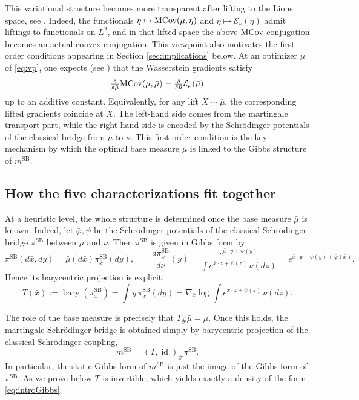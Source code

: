 \documentclass[reqno, a4paper]{amsart}
\DeclareMathOperator{\id}{id}
\newcommand{\msb}{m^{\text{SB}}}
\newcommand{\psb}{\pi^{\text{SB}}}
\theoremstyle{plain}
\theoremstyle{definition}
\theoremstyle{remark}
\numberwithin{equation}{section}
\numberwithin{theorem}{section}
\newcommand{\bary}{\operatorname{bary}}
\newcommand{\MCov}{\textnormal{MCov}}
\begin{document}
	This variational structure becomes more transparent after lifting to the Lions space, see \cite{BaPaSc24, PiSa25, BePaSc25}.
	Indeed,  the functionals \(\eta\mapsto \MCov(\mu,\eta)\) and \(\eta\mapsto \mathcal E_\nu(\eta)\) admit liftings to functionals on \(L^2\), and in that lifted space the above \(\MCov\)-conjugation becomes an actual convex conjugation.
	This viewpoint also motivates the first-order conditions appearing in Section \ref{sec:implications} below.
	At an optimizer \(\bar\mu\) of \eqref{eq:vp}, one expects (see \cite[Section 2]{BePaSc25}) that the Wasserstein gradients satisfy
	\[ \textstyle 
	\frac{\delta}{\delta\bar\mu}\MCov(\mu,\bar\mu)
	=
	\frac{\delta}{\delta\bar\mu}\mathcal E_\nu(\bar\mu)
	\]
	up to an additive constant.
	Equivalently, for any lift \(\bar X\sim\bar\mu\), the corresponding lifted gradients coincide at \(\bar X\).
	The left-hand side comes from the martingale transport part, while the right-hand side is encoded by the Schr\"odinger potentials of the classical bridge from \(\bar\mu\) to \(\nu\).
	This first-order condition is the key mechanism by which the optimal base measure \(\bar\mu\) is linked to the Gibbs structure of \(\msb\).
	
	\subsection{How the five characterizations fit together}
	
	At a heuristic level, the whole structure is determined once the base measure \(\bar\mu\) is known.
	Indeed, let \(\bar \varphi,\psi\) be the Schr\"odinger potentials of the classical Schr\"odinger bridge \(\psb\) between \(\bar\mu\) and \(\nu\).
	Then \(\psb\) is given in Gibbs form by
	\[
	\psb(d \bar x,dy)=\bar\mu(d \bar x)\psb_{\bar x}(dy),
	\qquad
	\frac{d\psb_{\bar x}}{d\nu}(y)=\frac{e^{\bar x\cdot y+\psi (y)}}{\int e^{ \bar x\cdot z+\psi(z)}\,\nu(dz)}=e^{\bar x\cdot y+ \psi (y)+\bar \varphi (\bar x)}.
	\]
	Hence its barycentric projection is explicit:
	\[
	T(\bar x):=\bary(\psb_{\bar x})=\int y\,\psb_{\bar x}(dy)
	=\nabla_{\bar x}\log\int e^{ \bar x \cdot z+\psi(z)}\,\nu(dz).
	\]
	
	The role of the base measure is precisely that \(T_{\#}\bar\mu=\mu\).
	Once this holds, the martingale Schr\"odinger bridge is obtained simply by barycentric projection of the classical Schr\"odinger coupling,
	\[
	\msb=(T,\id)_{\#}\psb.
	\]
	In particular, the static Gibbs form of \(\msb\) is just the image of the Gibbs form of \(\psb\). As we prove below \(T\) is invertible, which yields exactly a density of the form \eqref{eq:introGibbs}.
	
\end{document}
